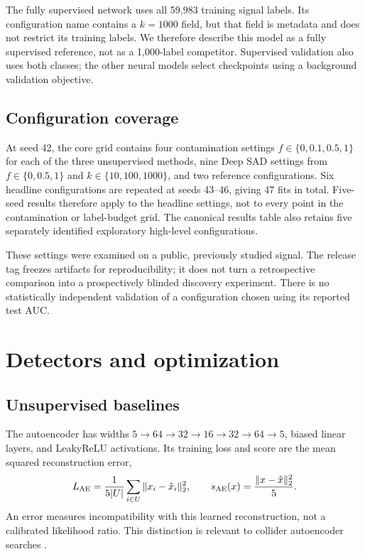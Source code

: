 \documentclass[reprint,aps,pra,amsmath,amssymb,floatfix,raggedbottom]{revtex4-2}
\begin{document}
The fully supervised network uses all 59,983 training signal labels. Its configuration name contains a $k=1000$ field, but that field is metadata and does not restrict its training labels. We therefore describe this model as a fully supervised reference, not as a 1,000-label competitor. Supervised validation also uses both classes; the other neural models select checkpoints using a background validation objective.

\subsection{Configuration coverage}
At seed 42, the core grid contains four contamination settings $f\in\{0,0.1,0.5,1\}$ for each of the three unsupervised methods, nine Deep SAD settings from $f\in\{0,0.5,1\}$ and $k\in\{10,100,1000\}$, and two reference configurations. Six headline configurations are repeated at seeds 43--46, giving 47 fits in total. Five-seed results therefore apply to the headline settings, not to every point in the contamination or label-budget grid. The canonical results table also retains five separately identified exploratory high-level configurations.

These settings were examined on a public, previously studied signal. The release tag freezes artifacts for reproducibility; it does not turn a retrospective comparison into a prospectively blinded discovery experiment. There is no statistically independent validation of a configuration chosen using its reported test AUC.

\section{Detectors and optimization}
\subsection{Unsupervised baselines}
The autoencoder has widths $5\to64\to32\to16\to32\to64\to5$, biased linear layers, and LeakyReLU activations. Its training loss and score are the mean squared reconstruction error,
\begin{equation}
 L_{\mathrm{AE}}={1\over5|U|}\sum_{i\in U}\|x_i-\hat x_i\|_2^2,
 \qquad s_{\mathrm{AE}}(x)={\|x-\hat x\|_2^2\over5}.
\end{equation}
An error measures incompatibility with this learned reconstruction, not a calibrated likelihood ratio. This distinction is relevant to collider autoencoder searches \cite{autoencoder}.
\end{document}
